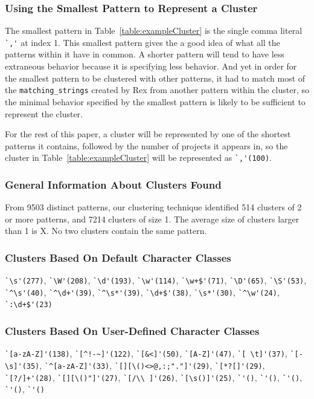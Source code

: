 \subsubsection{Using the Smallest Pattern to Represent a Cluster}
The smallest pattern in Table~\ref{table:exampleCluster} is the single comma literal \verb!`,'! at index 1.  This smallest pattern gives the a good idea of what all the patterns within it have in common.  A shorter pattern will tend to have less extraneous behavior because it is specifying less behavior.  And yet in order for the smallest pattern to be clustered with other patterns, it had to match most of the {\tt matching\_strings} created by Rex from another pattern within the cluster, so the minimal behavior specified by the smallest pattern is likely to be sufficient to represent the cluster.

For the rest of this paper, a cluster will be represented by one of the shortest patterns it contains, followed by the number of projects it appears in, so the cluster in Table~\ref{table:exampleCluster} will be represented as \verb!`,'(100)!.

\subsubsection{General Information About Clusters Found}
 From 9503 distinct patterns, our clustering technique identified 514 clusters of 2 or more patterns, and 7214 clusters of size 1.  The average size of clusters larger than 1 is X.
No two clusters contain the same pattern.

\subsubsection{Clusters Based On Default Character Classes}
\verb!`\s'(277)!, \verb!`\W'(208)!, \verb!`\d'(193)!, \verb!`\w'(114)!, \verb!`\w+$'(71)!, \verb!`\D'(65)!, \verb!`\S'(53)!, \verb!`^\s'(40)!, \verb!`^\d+'(39)!, \verb!`^\s*'(39)!, \verb!`\d+$'(38)!, \verb!`\s*'(30)!, \verb!`^\w'(24)!, \verb!`:\d+$'(23)!

\subsubsection{Clusters Based On User-Defined Character Classes}
\verb!`[a-zA-Z]'(138)!, \verb•`[^!-~]'(122)•, \verb!`[&<]'(50)!, \verb!`[A-Z]'(47)!, \verb!`[ \t]'(37)!, \verb!`[-\s]'(35)!, \verb!`^[a-zA-Z]'(33)!, \verb!`[][\()<>@,:;"."]'(29)!, \verb!`[*?[]'(29)!, \verb!`[?/]+'(28)!, \verb!`[][\()"]'(27)!, \verb!`[/\\ ]'(26)!, \verb!`[\s()]'(25)!, \verb!`'()!, \verb!`'()!, \verb!`'()!, \verb!`'()!, \verb!`'()!


